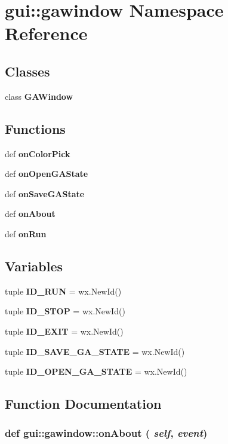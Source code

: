 \section{gui::gawindow Namespace Reference}
\label{namespacegui_1_1gawindow}


\subsection*{Classes}
\begin{CompactItemize}
\item 
class {\bf GAWindow}
\end{CompactItemize}
\subsection*{Functions}
\begin{CompactItemize}
\item 
def {\bf onColorPick}
\item 
def {\bf onOpenGAState}
\item 
def {\bf onSaveGAState}
\item 
def {\bf onAbout}
\item 
def {\bf onRun}
\end{CompactItemize}
\subsection*{Variables}
\begin{CompactItemize}
\item 
tuple {\bf ID\_\-RUN} = wx.NewId()
\item 
tuple {\bf ID\_\-STOP} = wx.NewId()
\item 
tuple {\bf ID\_\-EXIT} = wx.NewId()
\item 
tuple {\bf ID\_\-SAVE\_\-GA\_\-STATE} = wx.NewId()
\item 
tuple {\bf ID\_\-OPEN\_\-GA\_\-STATE} = wx.NewId()
\end{CompactItemize}


\subsection{Function Documentation}
\subsubsection{\setlength{\rightskip}{0pt plus 5cm}def gui::gawindow::onAbout ( {\em self},  {\em event})}\label{namespacegui_1_1gawindow_aa34eb2f4660713a9acf878306fb0541}




